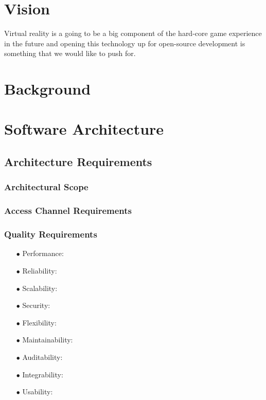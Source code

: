\documentclass[a4paper,12pt]{article}
\begin{document}
\newpage
\section{Vision}
Virtual reality is a going to be a big component of the hard-core game experience in the future and opening this technology up for open-source development is something that we would like to push for.
\newpage
\section{Background}

\newpage
\section{Software Architecture}
\subsection{Architecture Requirements}
\subsubsection{Architectural Scope}

\subsubsection{Access Channel Requirements}

\subsubsection{Quality Requirements}

 \begin{itemize}
 	\item[$\bullet$]Performance: 

 	\item[$\bullet$]Reliability:  

 	\item[$\bullet$]Scalability: 

 	\item[$\bullet$]Security:

 	\item[$\bullet$]Flexibility: 

	 \item[$\bullet$]Maintainability: 

 	\item[$\bullet$]Auditability:

 	\item[$\bullet$]Integrability:
 	\item[$\bullet$]Usability:

 	 \end{itemize}
\end{document}
